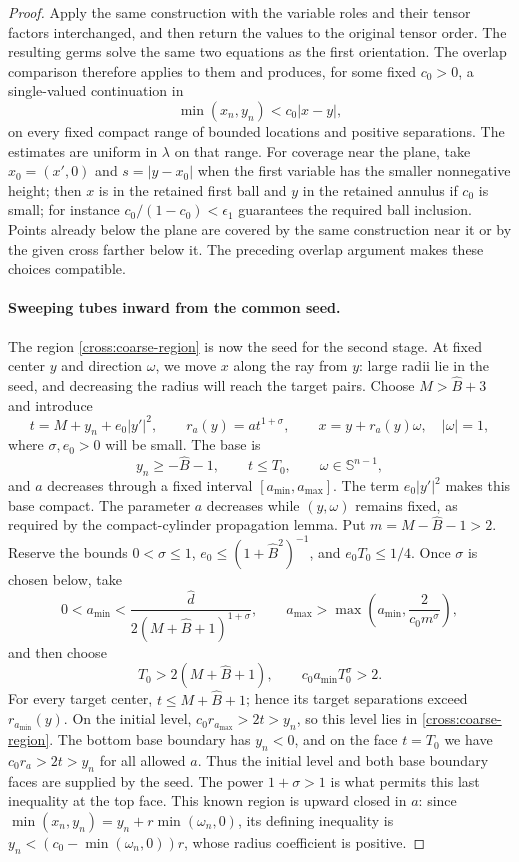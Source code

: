 \begin{proof}
Apply the same construction with the variable roles and their tensor
factors interchanged, and then return the values to the original tensor
order.  The resulting germs solve the same two equations as the first
orientation.  The overlap comparison therefore applies to them and
produces, for some fixed $c_0>0$, a single-valued continuation in
\begin{equation}\label{cross:coarse-region}
 \min(x_n,y_n)<c_0|x-y|,
\end{equation}
on every fixed compact range of bounded locations and positive
separations.  The estimates are uniform in $\lambda$ on that range.
For coverage near the plane, take $x_0=(x',0)$ and
$s=|y-x_0|$ when the first variable has the smaller nonnegative height;
then $x$ is in the retained first ball and $y$ in the retained annulus
if $c_0$ is small; for instance
$c_0/(1-c_0)<\epsilon_1$ guarantees the required ball inclusion.
Points already below the plane are covered by the
same construction near it or by the given cross farther below it.
The preceding overlap argument makes these choices compatible.

\paragraph{Sweeping tubes inward from the common seed.}
The region \eqref{cross:coarse-region} is now the seed for the second
stage. At fixed center $y$ and direction $\omega$, we move $x$ along the
ray from $y$: large radii lie in the seed, and decreasing the radius
will reach the target pairs. Choose $M>\widehat B+3$ and introduce
\begin{equation}\label{cross:tubes}
 t=M+y_n+e_0|y'|^2,\qquad r_a(y)=a t^{1+\sigma},\qquad
 x=y+r_a(y)\omega,\quad |\omega|=1,
\end{equation}
where $\sigma,e_0>0$ will be small.  The base is
\[
 y_n\ge-\widehat B-1,\qquad t\le T_0,\qquad \omega\in\mathbb S^{n-1},
\]
and $a$ decreases through a fixed interval $[a_{\min},a_{\max}]$.
The term $e_0|y'|^2$ makes this base compact. The parameter $a$ decreases
while $(y,\omega)$ remains fixed, as required by the compact-cylinder
propagation lemma.
Put $m=M-\widehat B-1>2$.  Reserve the bounds
$0<\sigma\le1$, $e_0\le(1+\widehat B^2)^{-1}$, and
$e_0T_0\le1/4$.  Once $\sigma$ is chosen below, take
\[
 0<a_{\min}<
 \frac{\widehat d}{2(M+\widehat B+1)^{1+\sigma}},
 \qquad
 a_{\max}>\max\left(a_{\min},\frac{2}{c_0m^\sigma}\right),
\]
and then choose
\[
 T_0>2(M+\widehat B+1),\qquad
 c_0a_{\min}T_0^\sigma>2.
\]
For every target center, $t\le M+\widehat B+1$; hence its target
separations exceed $r_{a_{\min}}(y)$.  On the initial level,
$c_0r_{a_{\max}}>2t>y_n$, so this level lies in
\eqref{cross:coarse-region}.  The bottom base boundary has $y_n<0$,
and on the face $t=T_0$ we have $c_0r_a>2t>y_n$ for all allowed $a$.
Thus the initial level and both base boundary faces are supplied by
the seed.  The power $1+\sigma>1$ is what permits this last inequality
at the top face.
This known region is upward closed in $a$: since
$\min(x_n,y_n)=y_n+r\min(\omega_n,0)$, its defining
inequality is $y_n<(c_0-\min(\omega_n,0))r$, whose radius coefficient
is positive.


\end{proof}
